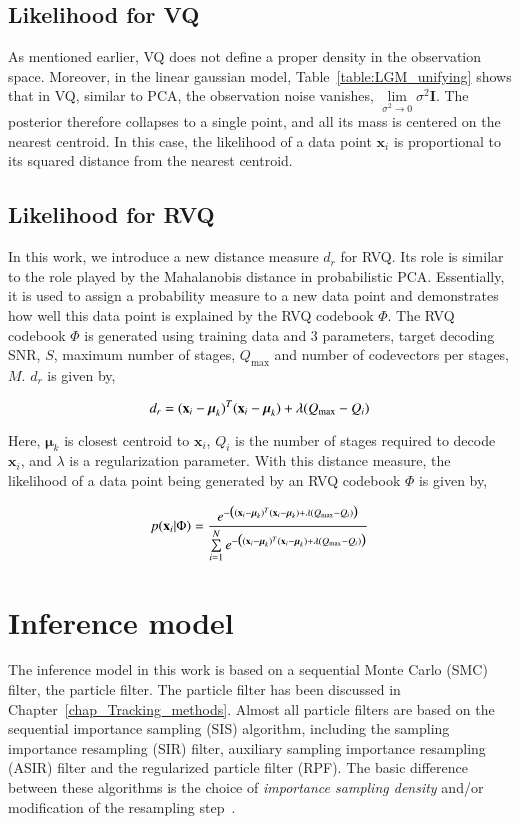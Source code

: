\subsection{Likelihood for VQ}
As mentioned earlier, VQ does not define a proper density in the observation space.  Moreover, in the linear gaussian model, Table~\ref{table:LGM_unifying} shows that in VQ, similar to PCA, the observation noise vanishes, $\lim\limits_{\sigma^2 \rightarrow 0} \sigma^2\mathbf{I}$.  The posterior therefore collapses to a single point, and all its mass is centered on the nearest centroid.  In this case, the likelihood of a data point $\mathbf{x}_i$ is proportional to its squared distance from the nearest centroid.

\subsection{Likelihood for RVQ}
In this work, we introduce a new distance measure $d_r$ for RVQ.  Its role is similar to the role played by the Mahalanobis distance in probabilistic PCA.  Essentially, it is used to assign a probability measure to a new data point and demonstrates how well this data point is explained by the RVQ codebook $\Phi$.  The RVQ codebook $\Phi$ is generated using training data and 3 parameters, target decoding SNR, $S$, maximum number of stages, $Q_{\textrm{max}}$ and number of codevectors per stages, $M$.  $d_r$ is given by,




\begin{equation}
d_r = (\mathbf{x}_i-\boldsymbol\mu_k)^T(\mathbf{x}_i-\boldsymbol\mu_k) + \lambda({Q_{\textrm{max}}-Q_i})
\end{equation}

Here, $\boldsymbol\mu_k$ is closest centroid to $\mathbf{x}_i$, $Q_i$ is the number of stages required to decode $\mathbf{x}_i$, and $\lambda$ is a regularization parameter.  With this distance measure, the likelihood of a data point being generated by an RVQ codebook $\Phi$ is given by,

\begin{equation}
p(\mathbf{x}_i|\Phi) = \frac{e^{-\big((\mathbf{x}_i-\boldsymbol\mu_k)^T(\mathbf{x}_i-\boldsymbol\mu_k) + \lambda({Q_{\textrm{max}}-Q_i})\big)}} {\sum\limits_{i=1}^N e^{-\big((\mathbf{x}_i-\boldsymbol\mu_k)^T(\mathbf{x}_i-\boldsymbol\mu_k) + \lambda({Q_{\textrm{max}}-Q_i})\big)}}
\end{equation}

\section{Inference model}
The inference model in this work is based on a sequential Monte Carlo (SMC) filter, the particle filter.  The particle filter has been discussed in Chapter~\ref{chap_Tracking_methods}.  Almost all particle filters are based on the sequential importance sampling (SIS) algorithm, including the sampling importance resampling (SIR) filter, auxiliary sampling importance resampling (ASIR) filter and the regularized particle filter (RPF).  The basic difference between these algorithms is the choice of \emph{importance sampling density} and/or modification of the resampling step~\cite{2002_JNL_PF_Arulampalam}.  

